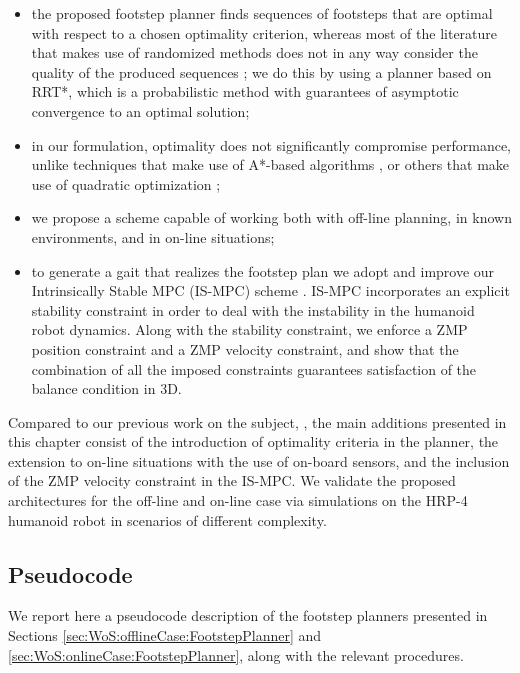 \begin{itemize}
\item the proposed footstep planner finds sequences of footsteps that are optimal with respect to a chosen optimality criterion, whereas most of the literature that makes use of randomized methods does not in any way consider the quality of the produced sequences \cite{Liu_IROS2012}; we do this by using a planner based on RRT*, which is a probabilistic method with guarantees of asymptotic convergence to an optimal solution;

\item in our formulation, optimality does not significantly compromise performance, unlike techniques that make use of A*-based algorithms \cite{Chestnutt_IROS2009,Maier_IROS2013,Karkowski_HUM2016}, or others that make use of quadratic optimization \cite{DeTe:14};

\item we propose a scheme capable of working both with off-line planning, in known environments, and in on-line situations;


\item to generate a gait that realizes the footstep plan we adopt and improve our Intrinsically Stable MPC (IS-MPC) scheme \cite{ScDeLaOr:20}. IS-MPC incorporates an explicit stability constraint in order to deal with the instability in the humanoid robot dynamics. Along with the stability constraint, we enforce a ZMP position constraint and a ZMP velocity constraint, and show that the combination of all the imposed constraints guarantees satisfaction of the balance condition in 3D.

\end{itemize}


Compared to our previous work on the subject, \cite{FeScLaOr:19}, the main additions presented in this chapter consist of the introduction of optimality criteria in the planner, the extension to on-line situations with the use of on-board sensors, and the inclusion of the ZMP velocity constraint in the IS-MPC. We validate the proposed architectures for the off-line and on-line case via simulations on the HRP-4 humanoid robot in scenarios of different complexity.


\subsection{Pseudocode}
\label{sec:WoS:Pseudocode}
  
We report here a pseudocode description of the footstep planners presented in Sections \ref{sec:WoS:offlineCase:FootstepPlanner} and \ref{sec:WoS:onlineCase:FootstepPlanner}, along with the relevant procedures. 

